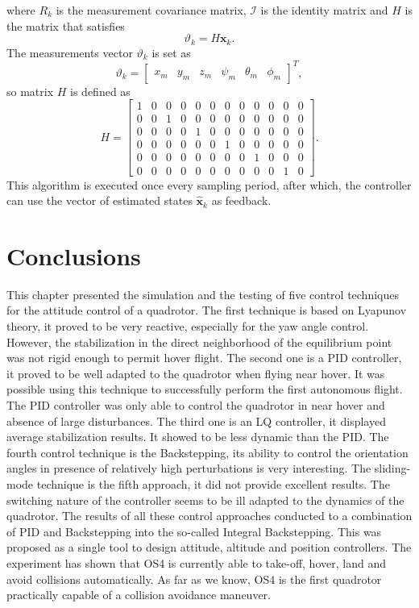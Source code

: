 where $R_k$ is the measurement covariance matrix, $\mathcal{I}$ is the identity matrix and $H$ is the matrix that satisfies
\begin{equation}
\vartheta_k = H \mathbf{x}_k.
\end{equation}
The measurements vector $\vartheta_k$ is set as
\begin{equation}
\vartheta_k = \begin{bmatrix}
x_{m} & y_{m} & z_{m} & \psi_{m} & \theta_{m} & \phi_{m}
\end{bmatrix}^{T},
\end{equation}
so matrix $H$ is defined as
\begin{equation}\label{eqn:H}
H =\begin{bmatrix}
1 & 0 & 0 & 0 & 0 & 0 & 0 & 0 & 0 & 0 & 0 & 0\\
0 & 0 & 1 & 0 & 0 & 0 & 0 & 0 & 0 & 0 & 0 & 0\\
0 & 0 & 0 & 0 & 1 & 0 & 0 & 0 & 0 & 0 & 0 & 0\\
0 & 0 & 0 & 0 & 0 & 0 & 1 & 0 & 0 & 0 & 0 & 0\\
0 & 0 & 0 & 0 & 0 & 0 & 0 & 0 & 1 & 0 & 0 & 0\\
0 & 0 & 0 & 0 & 0 & 0 & 0 & 0 & 0 & 0 & 1 & 0
			\end{bmatrix}.
\end{equation}
This algorithm is executed once every sampling period, after which, the controller can use the vector of estimated states $\hat{\mathbf{x}}_{k}$ as feedback.



\section{Conclusions}
This chapter presented the simulation and the testing of five control techniques
for the attitude control of a quadrotor. The first technique is based
on Lyapunov theory, it proved to be very reactive, especially for the yaw
angle control. However, the stabilization in the direct neighborhood of the
equilibrium point was not rigid enough to permit hover flight. The second
one is a PID controller, it proved to be well adapted to the quadrotor when
flying near hover. It was possible using this technique to successfully perform
the first autonomous flight. The PID controller was only able to control the
quadrotor in near hover and absence of large disturbances. The third one
is an LQ controller, it displayed average stabilization results. It showed to
be less dynamic than the PID. The fourth control technique is the Backstepping,
its ability to control the orientation angles in presence of relatively
high perturbations is very interesting. The sliding-mode technique is the fifth
approach, it did not provide excellent results. The switching nature of the
controller seems to be ill adapted to the dynamics of the quadrotor. The results
of all these control approaches conducted to a combination of PID and
Backstepping into the so-called Integral Backstepping. This was proposed
as a single tool to design attitude, altitude and position controllers. The
experiment has shown that OS4 is currently able to take-off, hover, land and
avoid collisions automatically. As far as we know, OS4 is the first quadrotor
practically capable of a collision avoidance maneuver.
